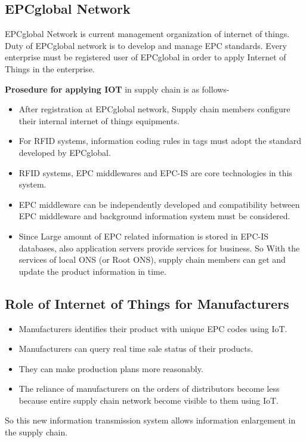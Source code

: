 \documentclass[12pt, a4paper]{report}
\begin{document}
\subsection{EPCglobal Network}
EPCglobal Network is current management organization of internet of things. Duty of EPCglobal network is to develop and manage EPC standards. Every enterprise must be registered user of EPCglobal in order to apply Internet of Things in the enterprise.\\


\par  \textbf{Prosedure for applying IOT} in supply chain is as follows-
\begin{itemize}
    \item After registration at EPCglobal network, Supply chain members configure their internal internet of things equipments.
    \item For RFID systems, information coding rules in tags must adopt the standard developed by EPCglobal.
    \item RFID systems, EPC middlewares and EPC-IS are core technologies in this system.
    \item EPC middleware can be independently developed and compatibility between EPC middleware and background information system must be considered.
    \item Since Large amount of EPC related information is stored in EPC-IS databases, also application servers provide services for business. So With the services of local ONS (or Root ONS), supply chain members can get and update the product information in time.
    
\end{itemize}

\subsection{Role of Internet of Things for Manufacturers}
\begin{itemize}
    \item Manufacturers identifies their product with unique EPC codes using IoT.
    \item Manufacturers can query real time sale status of their products.
    \item They can make production plans more reasonably.
    \item The reliance of manufacturers on the orders of distributors become less because entire supply chain network become visible to them using IoT.
\end{itemize}
So this new information transmission system allows information enlargement in the supply chain.
\end{document}
